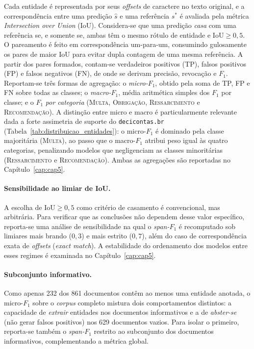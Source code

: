 Cada entidade é representada por seus \textit{offsets} de caractere no texto original, e a correspondência entre uma predição $\hat{s}$ e uma referência $s^{*}$ é avaliada pela métrica \textit{Intersection over Union} (IoU). Considera-se que uma predição \emph{casa} com uma referência se, e somente se, ambas têm o mesmo rótulo de entidade e $\mathrm{IoU} \geq 0{,}5$. O pareamento é feito em correspondência um-para-um, consumindo gulosamente os pares de maior IoU para evitar dupla contagem de uma mesma referência. A partir dos pares formados, contam-se verdadeiros positivos (TP), falsos positivos (FP) e falsos negativos (FN), de onde se derivam precisão, revocação e $F_1$. Reportam-se três formas de agregação: o \emph{micro-$F_1$}, obtido pela soma de TP, FP e FN sobre todas as classes; o \emph{macro-$F_1$}, média aritmética simples dos $F_1$ por classe; e o $F_1$ \emph{por categoria} (\textsc{Multa}, \textsc{Obrigação}, \textsc{Ressarcimento} e \textsc{Recomendação}). A distinção entre micro e macro é particularmente relevante dada a forte assimetria de suporte do \texttt{decicontas.br} (Tabela~\ref{tab:distribuicao_entidades}): o micro-$F_1$ é dominado pela classe majoritária (\textsc{Multa}), ao passo que o macro-$F_1$ atribui peso igual às quatro categorias, penalizando modelos que negligenciam as classes minoritárias (\textsc{Ressarcimento} e \textsc{Recomendação}). Ambas as agregações são reportadas no Capítulo~\ref{cap:cap5}.

\paragraph{Sensibilidade ao limiar de IoU.} A escolha de $\mathrm{IoU} \geq 0{,}5$ como critério de casamento é convencional, mas arbitrária. Para verificar que as conclusões não dependem desse valor específico, reporta-se uma análise de sensibilidade na qual o \textit{span-$F_1$} é recomputado sob limiares mais brando ($0{,}3$) e mais estrito ($0{,}7$), além do caso de correspondência exata de \textit{offsets} (\textit{exact match}). A estabilidade do ordenamento dos modelos entre esses regimes é examinada no Capítulo~\ref{cap:cap5}.

\paragraph{Subconjunto informativo.} Como apenas 232 dos 861 documentos contêm ao menos uma entidade anotada, o micro-$F_1$ sobre o \textit{corpus} completo mistura dois comportamentos distintos: a capacidade de \emph{extrair} entidades nos documentos informativos e a de \emph{abster-se} (não gerar falsos positivos) nos 629 documentos vazios. Para isolar o primeiro, reporta-se também o \textit{span-$F_1$} restrito ao subconjunto dos documentos informativos, complementando a métrica global.

